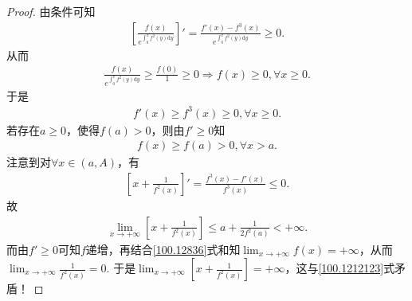 \documentclass[../../main.tex]{subfiles}
\begin{document}
\begin{proof}
由条件可知
\begin{align*}
\left[ \frac{f\left( x \right)}{e^{\int_0^x{f^2\left( y \right) \mathrm{d}y}}} \right]' =\frac{f' \left( x \right) -f^3\left( x \right)}{e^{\int_0^x{f^2\left( y \right) \mathrm{d}y}}}\geqslant 0.
\end{align*}
从而
\begin{align*}
\frac{f\left( x \right)}{e^{\int_0^x{f^2\left( y \right) \mathrm{d}y}}}\geqslant \frac{f\left( 0 \right)}{1}\geqslant 0\Longrightarrow f\left( x \right) \geqslant 0,\forall x\geqslant 0.
\end{align*}
于是
\begin{align*}
f' \left( x \right) \geqslant f^3\left( x \right) \geqslant 0,\forall x\geqslant 0.
\end{align*}
若存在$a\geqslant 0$，使得$f\left( a \right) >0$，则由$f' \geqslant 0$知
\begin{align}
f\left( x \right) \geqslant f\left( a \right) >0,\forall x>a. \label{100.12836}
\end{align}
注意到对$\forall x\in \left( a,A \right)$，有
\begin{align*}
\left[ x+\frac{1}{f^2\left( x \right)} \right]' =\frac{f^3\left( x \right) -f' \left( x \right)}{f^3\left( x \right)}\leqslant 0.
\end{align*}
故
\begin{align}
\lim_{x\rightarrow +\infty}\left[ x+\frac{1}{f^2\left( x \right)} \right] \leqslant a+\frac{1}{2f^2\left( a \right)}<+\infty . \label{100.1212123}
\end{align}
而由$f' \geqslant 0$可知$f$递增，再结合\eqref{100.12836}式和知$\lim_{x\rightarrow +\infty} f\left( x \right) =+\infty $，从而$\lim_{x\rightarrow +\infty}\frac{1}{f^2\left( x \right)}=0 .$
于是$\lim_{x\rightarrow +\infty}\left[ x+\frac{1}{f^2\left( x \right)} \right] =+\infty$，这与\eqref{100.1212123}式矛盾！

\end{proof}
\end{document}

